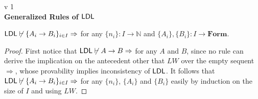 \documentclass[a4paper, 12pt]{paper}
\begin{document}
{\noindent
  v 1 \\
{\large\textbf{Generalized Rules of $\mathsf{LDL}$}}
}
\\

\begin{lem}
  $\mathsf{LDL} \not \vdash \{ A_i \to B_i \}_{i \in I} \Rightarrow$ for any $\{ n_i \} : I \to \mathbb{N}$ and $\{ A_i \}, \{ B_i \} : I \to \textbf{Form}$.
\end{lem}
\begin{proof}
  First notice that $\mathsf{LDL} \not \vdash A \to B \Rightarrow$ for any $A$ and $B$, since no rule can derive the implication on the antecedent other that $LW$ over the empty sequent $\Rightarrow$, whose provability implies inconsistency of $\mathsf{LDL}$. It follows that $\mathsf{LDL} \not \vdash \{ A_i \to B_i \}_{i \in I} \Rightarrow$ for any $\{n_i\}$, $\{ A_i \}$ and $\{ B_i \}$ easily by induction on the size of $I$ and using $LW$.
\end{proof}
\end{document}
